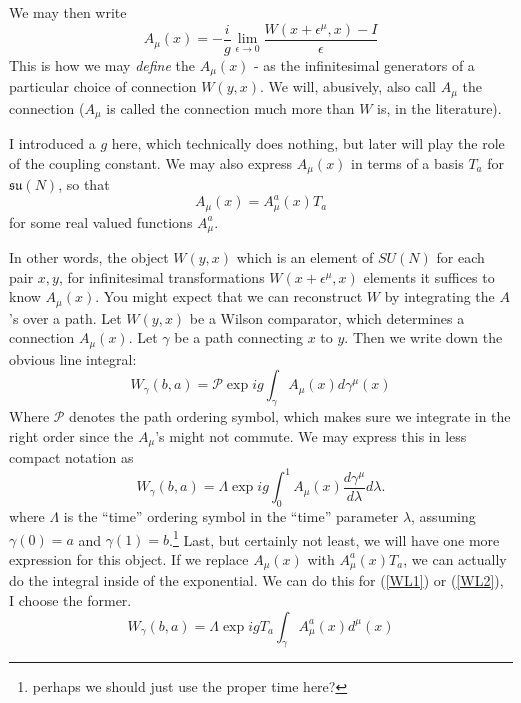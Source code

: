\documentclass[main.tex]{subfiles}
\begin{document}
We may then write
\begin{equation} \label{Amu1}
\boxed{A_\mu (x) = - \frac{i}{g} \lim_{\epsilon \to 0} \frac{W(x + \epsilon^\mu,x) - I}{\epsilon}}
\end{equation}
This is how we may \textit{define} the $A_\mu (x)$ - as the infinitesimal generators of a particular choice of connection $W(y,x)$. We will, abusively, also call $A_\mu$ the connection ($A_\mu$ is called the connection much more than $W$ is, in the literature).

I introduced a $g$ here, which technically does nothing, but later will play the role of the coupling constant. We may also express $A_\mu(x)$ in terms of a basis $T_a$ for $\mathfrak{su}(N)$, so that
\[
A_\mu (x) = A^a_\mu (x) T_a
\]
for some real valued functions $A^a_\mu$.

In other words, the object $W(y,x)$ which is an element of $SU(N)$ for each pair $x,y$, for infinitesimal transformations $W(x +\epsilon^\mu,x)$ elements it suffices to know $A_\mu (x)$. You might expect that we can reconstruct $W$ by integrating the $A$'s over a path. Let $W(y,x)$ be a Wilson comparator, which determines a connection $A_\mu (x)$. Let $\gamma$ be a path connecting $x$ to $y$. Then we write down the obvious line integral:
\begin{equation} \label{WL1}
W_\gamma (b,a) = \mathcal{P} \exp{ i g \int_{\gamma} A_\mu(x) d\gamma^\mu (x)}
\end{equation}
Where $\mathcal{P}$ denotes the path ordering symbol, which makes sure we  integrate in the right order since the $A_\mu$'s might not commute. We may express this in less compact notation as 
\begin{equation} \label{WL2}
W_\gamma (b,a) = \Lambda \exp{ i g \int_0^1 A_\mu (x) 
\frac{d \gamma^\mu}{d\lambda} d\lambda}.
\end{equation}
where $\Lambda$ is the ``time'' ordering symbol in the ``time'' parameter $\lambda$, assuming $\gamma(0) = a$ and $\gamma(1) = b$.\footnote{perhaps we should just use the proper time here?} Last, but certainly not least, we will have one more expression for this object. If we replace $A_\mu (x)$ with $A_\mu^a (x) T_a$, we can actually do the integral inside of the exponential. We can do this for (\ref{WL1}) or (\ref{WL2}), I choose the former.
\begin{equation} \label{WLT}
\boxed{W_\gamma (b,a) = \Lambda \exp{ ig T_a \int_\gamma A_\mu^a (x) d^\mu (x)}}
\end{equation}
\end{document}
